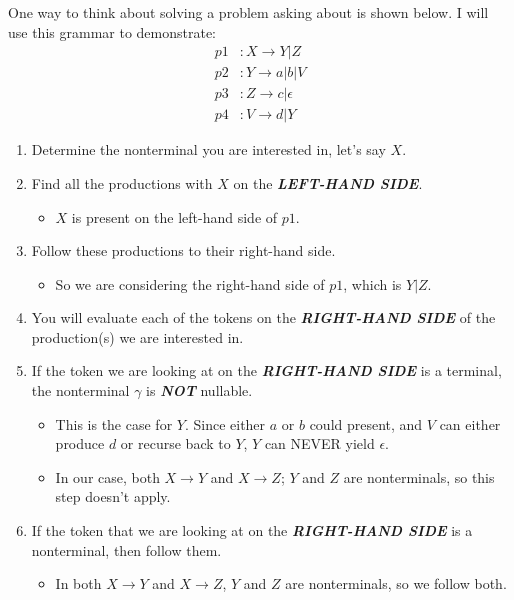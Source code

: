 \begin{blackbox}
  One way to think about solving a problem asking about  is shown below. I will use this grammar to demonstrate:
  \begin{align*}
    p1&: X \rightarrow Y \vert Z \\
    p2&: Y \rightarrow a \vert b \vert V \\
    p3&: Z \rightarrow c \vert \epsilon \\
    p4&: V \rightarrow d \vert Y
  \end{align*}

  \begin{enumerate}[noitemsep]
  \item Determine the nonterminal you are interested in, let's say $X$.
  \item Find all the productions with $X$ on the \textbf{\emph{LEFT-HAND SIDE}}.
    \begin{itemize}[noitemsep]
    \item $X$ is present on the left-hand side of $p1$.
    \end{itemize}
  \item Follow these productions to their right-hand side.
    \begin{itemize}[noitemsep]
    \item So we are considering the right-hand side of $p1$, which is $Y \vert Z$.
    \end{itemize}
  \item You will evaluate each of the tokens on the \textbf{\emph{RIGHT-HAND SIDE}} of the production(s) we are interested in.
  \item If the token we are looking at on the \textbf{\emph{RIGHT-HAND SIDE}} is a terminal, the nonterminal $\gamma$ is \textbf{\emph{NOT}} nullable.
    \begin{itemize}[noitemsep]
    \item This is the case for $Y$.
      Since either $a$ or $b$ could present, and $V$ can either produce $d$ or recurse back to $Y$, $Y$ can NEVER yield $\epsilon$.
    \item In our case, both $X \rightarrow Y$ and $X \rightarrow Z$; $Y$ and $Z$ are nonterminals, so this step doesn't apply.
    \end{itemize}
  \item If the token that we are looking at on the \textbf{\emph{RIGHT-HAND SIDE}} is a nonterminal, then follow them.
    \begin{itemize}[noitemsep]
    \item In both $X \rightarrow Y$ and $X \rightarrow Z$, $Y$ and $Z$ are nonterminals, so we follow both.

\end{itemize}
\end{enumerate}
\end{blackbox}
